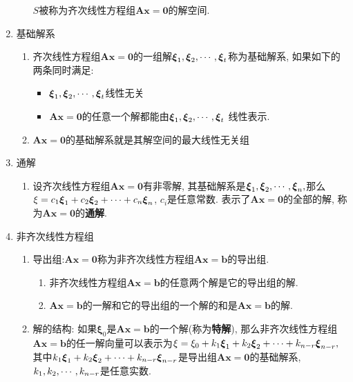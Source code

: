 \begin{enumerate}
\begin{enumerate}
$S$被称为齐次线性方程组$\boldsymbol{Ax}=\boldsymbol{0}$的解空间. 
\end{enumerate}
\item 基础解系
\begin{enumerate}
\item 齐次线性方程组$\boldsymbol{Ax}=\boldsymbol{0}$的一组解$\boldsymbol{\xi}_{1},\boldsymbol{\xi}_{2},\cdots,\boldsymbol{\xi}_{t}$称为基础解系,
如果如下的两条同时满足:
\begin{itemize}
\item \textbf{$\boldsymbol{\xi}_{1},\boldsymbol{\xi}_{2},\cdots,\boldsymbol{\xi}_{t}$}线性无关
\item $\boldsymbol{Ax}=\boldsymbol{0}$的任意一个解都能由\textbf{$\boldsymbol{\xi}_{1},\boldsymbol{\xi}_{2},\cdots,\boldsymbol{\xi}_{t}$
}线性表示.
\end{itemize}
\item $\boldsymbol{Ax}=\boldsymbol{0}$的基础解系就是其解空间的最大线性无关组
\end{enumerate}
\item 通解
\begin{enumerate}
\item 设齐次线性方程组$\boldsymbol{Ax}=\boldsymbol{0}$有非零解, 其基础解系是$\boldsymbol{\xi}_{1},\boldsymbol{\xi}_{2},\cdots,\boldsymbol{\xi}_{n},$那么$\xi=c_{1}\boldsymbol{\xi}_{1}+c_{2}\boldsymbol{\xi}_{2}+\cdots+c_{n}\boldsymbol{\xi}_{n}$,
$c_{i}$是任意常数. 表示了$\boldsymbol{Ax}=\boldsymbol{0}$的全部的解, 称为$\boldsymbol{Ax}=\boldsymbol{0}$的\textbf{通解}. 
\end{enumerate}
\item 非齐次线性方程组
\begin{enumerate}
\item 导出组:$\boldsymbol{Ax}=\boldsymbol{0}$称为非齐次线性方程组$\boldsymbol{Ax}=\boldsymbol{b}$的导出组. 
\begin{enumerate}
\item 非齐次线性方程组$\boldsymbol{Ax}=\boldsymbol{b}$的任意两个解是它的导出组的解. 
\item $\boldsymbol{Ax}=\boldsymbol{b}$的一解和它的导出组的一个解的和是$\boldsymbol{Ax}=\boldsymbol{b}$的解. 
\end{enumerate}
\item 解的结构: 如果$\boldsymbol{\xi}_{0}$是$\boldsymbol{Ax}=\boldsymbol{b}$的一个解(称为\textbf{特解}),
那么非齐次线性方程组$\boldsymbol{Ax}=\boldsymbol{b}$的任一解向量可以表示为$\xi=\xi_{0}+k_{1}\boldsymbol{\xi}_{1}+k_{2}\boldsymbol{\xi}_{2}+\cdots+k_{n-r}\boldsymbol{\xi}_{n-r},$其中$k_{1}\boldsymbol{\xi}_{1}+k_{2}\boldsymbol{\xi}_{2}+\cdots+k_{n-r}\boldsymbol{\xi}_{n-r}$是导出组$\boldsymbol{Ax}=\boldsymbol{0}$的基础解系,
$k_{1},k_{2},\cdots,k_{n-r}$是任意实数. 
\end{enumerate}
\end{enumerate}

